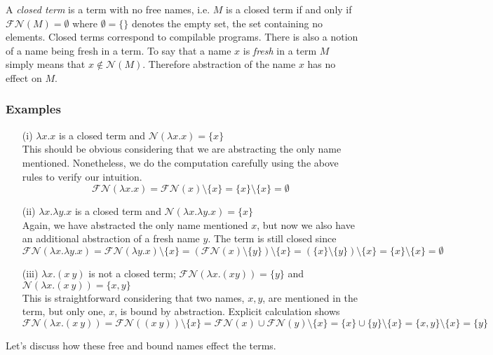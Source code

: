 \documentclass[12pt]{article}
\numberwithin{equation}{section}
\begin{document}
A \emph{closed term} is a term with no free names, i.e. $M$ is a closed term if and only if $\mathcal{FN}(M)=\emptyset$ where $\emptyset=\{ \}$ denotes the empty set, the set containing no elements. Closed terms correspond to compilable programs. There is also a notion of a name being fresh in a term. To say that a name $x$ is \emph{fresh} in a term $M$ simply means that $x \notin \mathcal{N}(M)$. Therefore abstraction of the name $x$ has no effect on $M$.

\subsubsection{Examples}
\begin{itemize}
\item[(i)] $\lambda x. x$ is a closed term and $\mathcal{N}(\lambda x. x)=\{ x \}$ \\
This should be obvious considering that we are abstracting the only name mentioned. Nonetheless, we do the computation carefully using the above rules to verify our intuition.
\[ \mathcal{FN}(\lambda x. x) = \mathcal{FN}(x) \setminus \{ x \} = \{x \} \setminus \{ x \} = \emptyset \]

\item[(ii)] $\lambda x. \lambda y. x$ is a closed term and $\mathcal{N}(\lambda x. \lambda y. x)=\{ x \}$ \\
Again, we have abstracted the only name mentioned $x$, but now we also have an additional abstraction of a fresh name $y$. The term is still closed since
\[ \mathcal{FN}(\lambda x. \lambda y. x) = \mathcal{FN}(\lambda y. x) \setminus \{ x \} = (\mathcal{FN}(x) \setminus \{ y \} ) \setminus \{ x \} = (\{ x \} \setminus \{ y \}) \setminus \{ x \} = \{x \} \setminus \{ x \} = \emptyset \]

\item[(iii)] $\lambda x.(x \ y)$ is not a closed term; $\mathcal{FN}(\lambda x. (x y)) = \{ y \}$ and $\mathcal{N}(\lambda x. (x \ y))=\{ x, y \}$ \\
This is straightforward considering that two names, $x, y$, are mentioned in the term, but only one, $x$, is bound by abstraction. Explicit calculation shows
\[ \mathcal{FN}(\lambda x. (x \ y)) = \mathcal{FN}((x \ y)) \setminus \{ x \} = \mathcal{FN}(x) \cup \mathcal{FN}(y) \setminus \{x \} = \{x \} \cup \{y \} \setminus \{x \} = \{ x, y \} \setminus \{ x \} = \{ y \} \]
\end{itemize}

Let's discuss how these free and bound names effect the terms.
\end{document}
